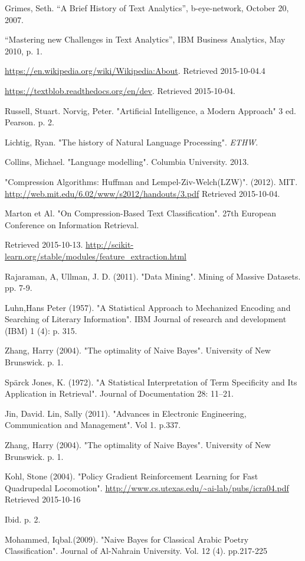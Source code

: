 \documentclass[a4paper,10pt]{article}
\begin{document}
\begin{thebibliography}{9}

Grimes, Seth. “A Brief History of Text Analytics”, b-eye-network, October 20, 2007.

“Mastering new Challenges in Text Analytics”, IBM Business Analytics, May 2010, p. 1.

\url{https://en.wikipedia.org/wiki/Wikipedia:About}. Retrieved 2015-10-04.4

\url{https://textblob.readthedocs.org/en/dev}. Retrieved 2015-10-04.

Russell, Stuart. Norvig, Peter. "Artificial Intelligence, a Modern Approach" 3 ed. Pearson. p. 2.

Lichtig, Ryan. "The history of Natural Language Processing". \textit{ETHW}. 

Collins, Michael. "Language modelling". Columbia University. 2013.


"Compression Algorithms: Huffman and Lempel-Ziv-Welch(LZW)". (2012). MIT.
\url{http://web.mit.edu/6.02/www/s2012/handouts/3.pdf} Retrieved 2015-10-04.

Marton et Al. "On Compression-Based Text Classification". 27th European Conference on Information Retrieval.


Retrieved 2015-10-13.
\url{http://scikit-learn.org/stable/modules/feature_extraction.html}

Rajaraman, A, Ullman, J. D. (2011). "Data Mining". Mining of Massive Datasets. pp. 7-9.

Luhn,Hans Peter (1957). "A Statistical Approach to Mechanized Encoding and Searching of Literary Information". IBM Journal of research and development (IBM) 1 (4): p. 315.



Zhang, Harry (2004). "The optimality of Naive Bayes". University of New Brunswick. p. 1.


Spärck Jones, K. (1972). "A Statistical Interpretation of Term Specificity and Its Application in Retrieval". Journal of Documentation 28: 11–21.

Jin, David. Lin, Sally (2011). "Advances in Electronic Engineering, Communication and Management". Vol 1. p.337.

Zhang, Harry (2004). "The optimality of Naive Bayes". University of New Brunswick. p. 1.

Kohl, Stone (2004). "Policy Gradient Reinforcement Learning for Fast Quadrupedal Locomotion".
\url{http://www.cs.utexas.edu/~ai-lab/pubs/icra04.pdf} Retrieved 2015-10-16

Ibid. p. 2.

Mohammed, Iqbal.(2009). "Naive Bayes for Classical Arabic Poetry Classification". Journal of Al-Nahrain University. Vol. 12 (4). pp.217-225
\end{thebibliography}



\end{document}
